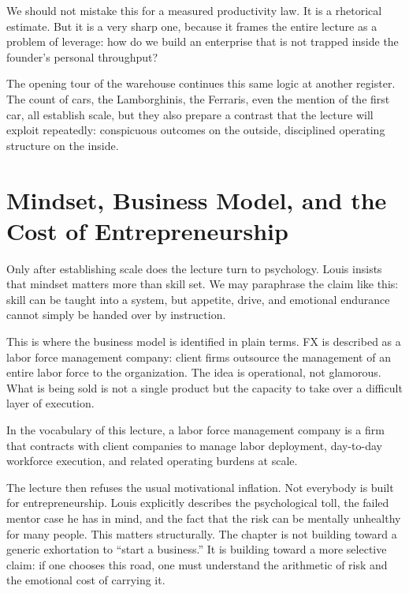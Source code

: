 We should not mistake this for a measured productivity law. It is a rhetorical estimate. But it is a very sharp one, because it frames the entire lecture as a problem of leverage: how do we build an enterprise that is not trapped inside the founder's personal throughput?

The opening tour of the warehouse continues this same logic at another register. The count of cars, the Lamborghinis, the Ferraris, even the mention of the first car, all establish scale, but they also prepare a contrast that the lecture will exploit repeatedly: conspicuous outcomes on the outside, disciplined operating structure on the inside.

\section{Mindset, Business Model, and the Cost of Entrepreneurship}

Only after establishing scale does the lecture turn to psychology. Louis insists that mindset matters more than skill set. We may paraphrase the claim like this: skill can be taught into a system, but appetite, drive, and emotional endurance cannot simply be handed over by instruction.

This is where the business model is identified in plain terms. FX is described as a labor force management company: client firms outsource the management of an entire labor force to the organization. The idea is operational, not glamorous. What is being sold is not a single product but the capacity to take over a difficult layer of execution.

\begin{definition}
In the vocabulary of this lecture, a labor force management company is a firm that contracts with client companies to manage labor deployment, day-to-day workforce execution, and related operating burdens at scale.
\end{definition}

The lecture then refuses the usual motivational inflation. Not everybody is built for entrepreneurship. Louis explicitly describes the psychological toll, the failed mentor case he has in mind, and the fact that the risk can be mentally unhealthy for many people. This matters structurally. The chapter is not building toward a generic exhortation to ``start a business.'' It is building toward a more selective claim: if one chooses this road, one must understand the arithmetic of risk and the emotional cost of carrying it.

